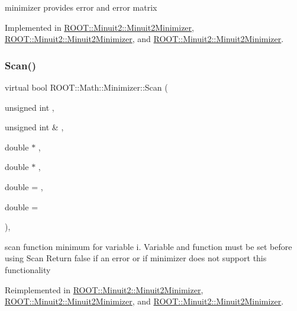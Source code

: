 minimizer provides error and error matrix 



Implemented in \mbox{\hyperlink{classROOT_1_1Minuit2_1_1Minuit2Minimizer_a3a3a8abea38285fe639f2f0ec5505533}{R\+O\+O\+T\+::\+Minuit2\+::\+Minuit2\+Minimizer}}, \mbox{\hyperlink{classROOT_1_1Minuit2_1_1Minuit2Minimizer_a3a3a8abea38285fe639f2f0ec5505533}{R\+O\+O\+T\+::\+Minuit2\+::\+Minuit2\+Minimizer}}, and \mbox{\hyperlink{classROOT_1_1Minuit2_1_1Minuit2Minimizer_a3a3a8abea38285fe639f2f0ec5505533}{R\+O\+O\+T\+::\+Minuit2\+::\+Minuit2\+Minimizer}}.

\mbox{\label{classROOT_1_1Math_1_1Minimizer_a1e6e4b32d7338a7a08791cff67f54080}} 
\subsubsection{\texorpdfstring{Scan()}{Scan()}\hspace{0.1cm}{\footnotesize\ttfamily [1/3]}}
{\footnotesize\ttfamily virtual bool R\+O\+O\+T\+::\+Math\+::\+Minimizer\+::\+Scan (\begin{DoxyParamCaption}\item[{unsigned int}]{,  }\item[{unsigned int \&}]{,  }\item[{double $\ast$}]{,  }\item[{double $\ast$}]{,  }\item[{double}]{ = {},  }\item[{double}]{ = {} }\end{DoxyParamCaption})\hspace{0.3cm}{\ttfamily [inline]}, {\ttfamily [virtual]}}

scan function minimum for variable i. Variable and function must be set before using Scan Return false if an error or if minimizer does not support this functionality 

Reimplemented in \mbox{\hyperlink{classROOT_1_1Minuit2_1_1Minuit2Minimizer_a3f2f94c743a9b120a71da5ba23bd88cb}{R\+O\+O\+T\+::\+Minuit2\+::\+Minuit2\+Minimizer}}, \mbox{\hyperlink{classROOT_1_1Minuit2_1_1Minuit2Minimizer_a3f2f94c743a9b120a71da5ba23bd88cb}{R\+O\+O\+T\+::\+Minuit2\+::\+Minuit2\+Minimizer}}, and \mbox{\hyperlink{classROOT_1_1Minuit2_1_1Minuit2Minimizer_a3f2f94c743a9b120a71da5ba23bd88cb}{R\+O\+O\+T\+::\+Minuit2\+::\+Minuit2\+Minimizer}}.

